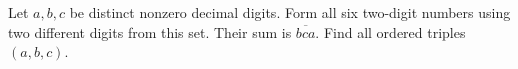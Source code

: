 Let $a,b,c$ be distinct nonzero decimal digits. Form all six two-digit numbers using two different digits from this set. Their sum is $\overline{bca}$. Find all ordered triples $(a,b,c)$.
